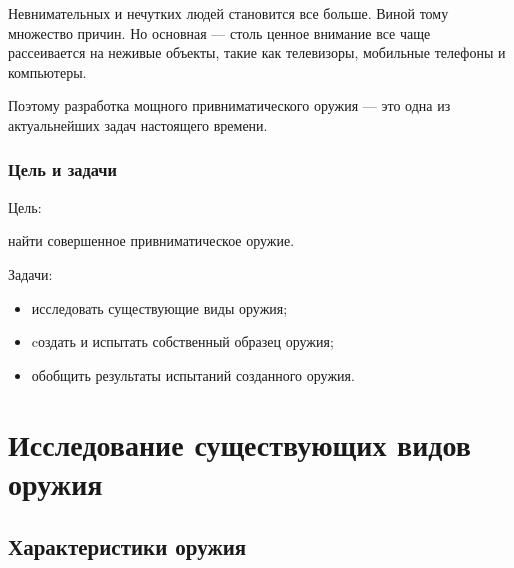 Невнимательных и нечутких людей становится все больше. Виной тому множество причин. Но основная --- столь ценное внимание все чаще рассеивается на неживые объекты, такие как телевизоры, мобильные телефоны и компьютеры.
    
Поэтому разработка мощного привниматического оружия --- это одна из актуальнейших задач настоящего времени.

\begin{frame}
    \frametitle{Цель и задачи}
    
    \begin{block}{Цель:}
        \begin{center}
            найти \alert{совершенное} привниматическое оружие.
        \end{center}
    \end{block}
    
    \par\bigskip
    
    \begin{block}{Задачи:}
        \begin{itemize}
            \item исследовать существующие виды оружия; 
            \item cоздать и испытать собственный образец оружия;
            \item обобщить результаты испытаний созданного оружия.
        \end{itemize}
    \end{block}
\end{frame}


\section{Исследование существующих видов оружия}

\subsection{Характеристики оружия}

